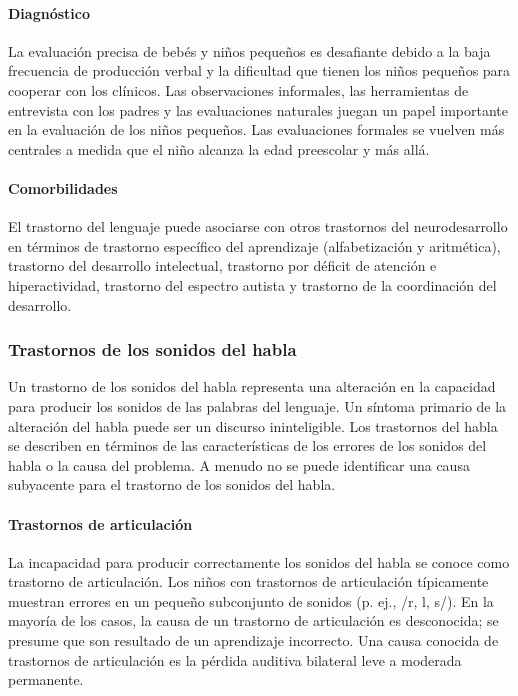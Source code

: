 \documentclass[11pt,letterpaper]{report}
\begin{document}
\paragraph{Diagnóstico}
La evaluación precisa de bebés y niños pequeños es desafiante debido a la
baja frecuencia de producción verbal y la dificultad que tienen los niños
pequeños para cooperar con los clínicos. Las observaciones informales, las
herramientas de entrevista con los padres y las evaluaciones naturales juegan
un papel importante en la evaluación de los niños pequeños. Las evaluaciones
formales se vuelven más centrales a medida que el niño alcanza la edad
preescolar y más allá. \cite{Nelson53}

\paragraph{Comorbilidades}
El trastorno del lenguaje puede asociarse con otros trastornos del
neurodesarrollo en términos de trastorno específico del aprendizaje
(alfabetización y aritmética), trastorno del desarrollo intelectual, trastorno
por déficit de atención e hiperactividad, trastorno del espectro autista y
trastorno de la coordinación del desarrollo. \cite{Feldman44}

\subsubsection{Trastornos de los sonidos del habla}
Un trastorno de los sonidos del habla representa una alteración en la
capacidad para producir los sonidos de las palabras del lenguaje. Un síntoma
primario de la alteración del habla puede ser un discurso ininteligible. Los
trastornos del habla se describen en términos de las características de los
errores de los sonidos del habla o la causa del problema. A menudo no se puede
identificar una causa subyacente para el trastorno de los sonidos del habla.
\cite{Feldman44}

\paragraph{Trastornos de articulación}
La incapacidad para producir correctamente los sonidos del habla se conoce
como trastorno de articulación. Los niños con trastornos de articulación
típicamente muestran errores en un pequeño subconjunto de sonidos
(p. ej., /r, l, s/). En la mayoría de los casos, la causa de un trastorno de
articulación es desconocida; se presume que son resultado de un aprendizaje
incorrecto. Una causa conocida de trastornos de articulación es la pérdida
auditiva bilateral leve a moderada permanente. \cite{Feldman44}
\end{document}
